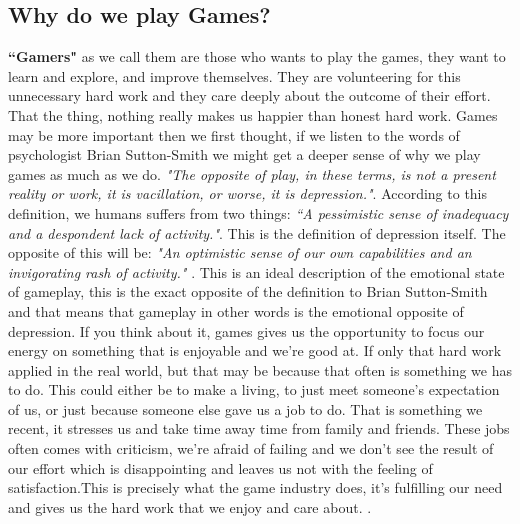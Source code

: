 \subsection{Why do we play Games?}
\label{WhyWePlay}
\textbf{``Gamers"} as we call them are those who wants to play the games, they want to learn and explore, and improve themselves. They are volunteering for this unnecessary hard work and they care deeply about the outcome of their effort. That the thing, nothing really makes us happier than honest hard work. Games may be more important then we first thought, if we listen to the words of psychologist Brian Sutton-Smith we might get a deeper sense of why we play games as much as we do. \textit{"The opposite of play, in these terms, is not a present reality or work, it is vacillation, or worse, it is depression."}\cite[P.~198]{AmbiguityOfPlay}. According to this definition, we humans suffers from two things: \textit{``A pessimistic sense of inadequacy and a despondent lack of activity."}\cite{depressionwebsite}. This is the definition of depression itself. The opposite of this will be: \textit{"An optimistic sense of our own capabilities and an invigorating rash of activity."} \cite[P.~28]{RealityIsBroken}. This is an ideal description of the emotional state of gameplay, this is the exact opposite of the definition to Brian Sutton-Smith and that means that gameplay in other words is the emotional opposite of depression. If you think about it, games gives us the opportunity to focus our energy on something that is enjoyable and we're good at. If only that hard work applied in the real world, but that may be because that often is something we has to do. This could either be to make a living, to just meet someone's expectation of us, or just because someone else gave us a job to do. That is something we recent, it stresses us  and take time away time from family and friends. These jobs often comes with criticism, we're afraid of failing and we don't see the result of our effort which is disappointing and leaves us not with the feeling of satisfaction.This is precisely what the game industry does, it's fulfilling our need and gives us the hard work that we enjoy and care about. \cite[P.~28-36]{RealityIsBroken}.

